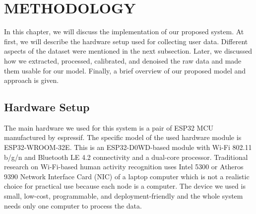 \chapter{METHODOLOGY}
 \label{Chapter 4}

In this chapter, we will discuss the implementation of our proposed system. At first, we will describe the hardware setup used for collecting user data. Different aspects of the dataset were mentioned in the next subsection. Later, we discussed how we extracted, processed, calibrated, and denoised the raw data and made them usable for our model. Finally, a brief overview of our proposed model and approach is given.

\section{Hardware Setup}
The main hardware we used for this system is a pair of ESP32 MCU manufactured by espressif. The specific model of the used hardware module is ESP32-WROOM-32E. This is an ESP32-D0WD-based module with Wi-Fi 802.11 b/g/n and Bluetooth LE 4.2 connectivity and a dual-core processor. Traditional research on Wi-Fi-based human activity recognition uses Intel 5300 or Atheros 9390 Network Interface Card (NIC) of a laptop computer \cite{10.1145/3310194, 9264288, 9060143, 8873550, 10.1145/2789168.2790093} which is not a realistic choice for practical use because each node is a computer. The device we used is small, low-cost, programmable, and deployment-friendly and the whole system needs only one computer to process the data. 

